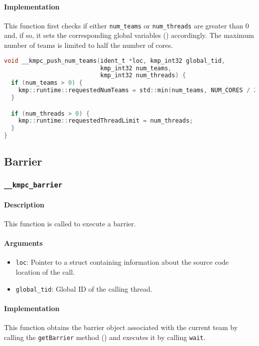 \paragraph{Implementation} This function first checks if either \texttt{num\_teams} or
\texttt{num\_threads} are greater than 0 and, if so, it sets the corresponding global variables
() accordingly. The maximum number of teams is limited to half the number of cores.

\begin{lstlisting}[language=C, caption={__kmpc_push_num_teams}, label={lst:kmpc-push-num-teams}, escapechar=@]
void __kmpc_push_num_teams(ident_t *loc, kmp_int32 global_tid,
                           kmp_int32 num_teams,
                           kmp_int32 num_threads) {
  if (num_teams > 0) {
    kmp::runtime::requestedNumTeams = std::min(num_teams, NUM_CORES / 2);
  }

  if (num_threads > 0) {
    kmp::runtime::requestedThreadLimit = num_threads;
  }
}
\end{lstlisting}

\subsection{Barrier}

\subsubsection{\texttt{__kmpc_barrier}}
\label{subsubsec:kmpc-barrier}

\paragraph{Description} This function is called to execute a barrier.

\paragraph{Arguments}
\begin{itemize}
	\item \texttt{loc}: Pointer to a struct containing information about the source code location
	      of the call.
	\item \texttt{global\_tid}: Global ID of the calling thread.
\end{itemize}

\paragraph{Implementation} This function obtains the barrier object associated with the current team
by calling the \texttt{getBarrier} method () and executes it by calling \texttt{wait}.

